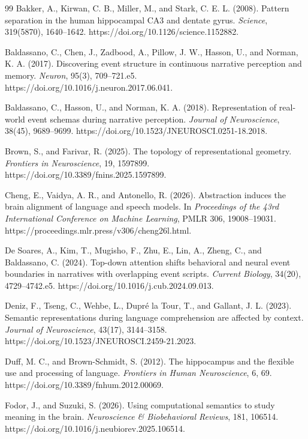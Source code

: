 \documentclass[11pt]{article}
\begin{document}
\begin{thebibliography}{99}
Bakker, A., Kirwan, C. B., Miller, M., and Stark, C. E. L. (2008).
Pattern separation in the human hippocampal CA3 and dentate gyrus.
\emph{Science}, 319(5870), 1640--1642.
https://doi.org/10.1126/science.1152882.

Baldassano, C., Chen, J., Zadbood, A., Pillow, J. W., Hasson, U., and
Norman, K. A. (2017). Discovering event structure in continuous
narrative perception and memory. \emph{Neuron}, 95(3), 709--721.e5.
https://doi.org/10.1016/j.neuron.2017.06.041.

Baldassano, C., Hasson, U., and Norman, K. A. (2018). Representation of
real-world event schemas during narrative perception. \emph{Journal of
Neuroscience}, 38(45), 9689--9699.
https://doi.org/10.1523/JNEUROSCI.0251-18.2018.

Brown, S., and Farivar, R. (2025). The topology of representational
geometry. \emph{Frontiers in Neuroscience}, 19, 1597899.
https://doi.org/10.3389/fnins.2025.1597899.

Cheng, E., Vaidya, A. R., and Antonello, R. (2026). Abstraction induces
the brain alignment of language and speech models. In \emph{Proceedings
of the 43rd International Conference on Machine Learning}, PMLR 306,
19008--19031. https://proceedings.mlr.press/v306/cheng26l.html.

De Soares, A., Kim, T., Mugisho, F., Zhu, E., Lin, A., Zheng, C., and
Baldassano, C. (2024). Top-down attention shifts behavioral and neural
event boundaries in narratives with overlapping event scripts.
\emph{Current Biology}, 34(20), 4729--4742.e5.
https://doi.org/10.1016/j.cub.2024.09.013.

Deniz, F., Tseng, C., Wehbe, L., Dupré la Tour, T., and Gallant, J. L.
(2023). Semantic representations during language comprehension are
affected by context. \emph{Journal of Neuroscience}, 43(17), 3144--3158.
https://doi.org/10.1523/JNEUROSCI.2459-21.2023.

Duff, M. C., and Brown-Schmidt, S. (2012). The hippocampus and the
flexible use and processing of language. \emph{Frontiers in Human
Neuroscience}, 6, 69. https://doi.org/10.3389/fnhum.2012.00069.

Fodor, J., and Suzuki, S. (2026). Using computational semantics to study
meaning in the brain. \emph{Neuroscience \& Biobehavioral Reviews}, 181,
106514. https://doi.org/10.1016/j.neubiorev.2025.106514.


\end{thebibliography}
\end{document}
